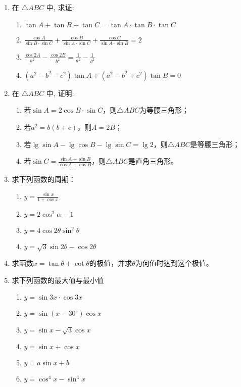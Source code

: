\begin{enumerate}
\item 在 $\triangle A B C$ 中, 求证:
\begin{enumerate}
    \item $\tan  A+\tan  B+\tan  C=\tan  A \cdot \tan  B \cdot \tan  C$
    \item $\frac{\cos A}{\sin B \cdot \sin C}+\frac{\cos B}{\sin A \cdot \sin C}+\frac{\cos C}{\sin A \cdot \sin B}=2$
    \item $\frac{\cos 2 A}{a^{2}}-\frac{\cos 2 B}{b^{2}}=\frac{1}{a^{2}}-\frac{1}{b^{2}}$
    \item $\left(a^{2}-b^{2}-c^{2}\right) \tan  A+\left(a^{2}-b^{2}+c^{2}\right) \tan  B=0$
\end{enumerate}


\item 在 $\triangle A B C$ 中, 证明:
\begin{enumerate}
    \item 若$\sin A=2\cos B\cdot \sin C$，则$\triangle A B C$为等腰三角形；
    \item 若$a^2=b(b+c)$，则$A=2B$；
    \item 若$\lg\sin A-\lg\cos B-\lg\sin C=\lg2$，则$\triangle A B C$是等腰三角形；
    \item 若$\sin C=\frac{\sin A+\sin B}{\cos A+\cos B}$，则$\triangle A B C$是直角三角形。
\end{enumerate}
\item 求下列函数的周期：
\begin{multicols}{2}
\begin{enumerate}
    \item $y=\frac{\sin x}{1+\cos x}$
    \item $y=2 \cos ^{2} \alpha-1$
    \item $y=4 \cos 2 \theta \sin ^{2} \theta$
    \item $y=\sqrt{3} \sin 2 \theta-\cos 2 \theta$
\end{enumerate}    
\end{multicols}

\item 求函数$x=\tan\theta+\cot\theta$的极值，并求$\theta$为何值时达到这个极值。
\item 求下列函数的最大值与最小值
\begin{multicols}{2}
\begin{enumerate}
    \item $y=\sin 3 x \cdot \cos 3 x$
    \item $y=\sin \left(x-30^{\circ}\right) \cos x$
    \item $y=\sin x-\sqrt{3} \cos x$
\item $y=\sin x+\cos x$
\item $y=a \sin x+b$
\item $y=\cos ^{4} x-\sin ^{4} x$
\end{enumerate}    
\end{multicols}



\end{enumerate}
